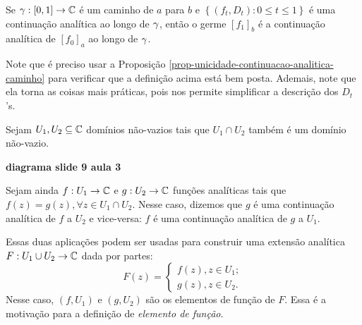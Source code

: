     \begin{definicao}
    \label{def-continuacao-analitica-germe}
        Se $\gamma: [0,1]\to\mathbb{C}$ é um caminho de $a$ para $b$ e 
        $\left\{ (f_t, D_t): 0\leq t\leq 1 \right\}$ é uma continuação analítica ao
        longo de $\gamma$, então o germe $[f_1]_b$ é a continuação analítica de
        $[f_0]_a$ ao longo de $\gamma$.
    \end{definicao}

    Note que é preciso usar a Proposição \ref{prop-unicidade-continuacao-analitica-caminho}
    para verificar que a definição acima está bem posta. Ademais, note que ela torna
    as coisas mais práticas, pois nos permite simplificar a descrição dos $D_t$'s.

    \begin{observacao}
        Sejam $U_1, U_2\subseteq\mathbb{C}$ domínios não-vazios tais que $U_1\cap U_2$
        também é um domínio não-vazio.
        \begin{center}
            \textbf{diagrama slide 9 aula 3}
        \end{center}
        Sejam ainda $f:U_1\to\mathbb{C}$ e $g:U_2\to\mathbb{C}$ funções analíticas
        tais que $f(z) = g(z), \forall z\in U_1\cap U_2$. Nesse caso, dizemos que
        $g$ é uma continuação analítica de $f$ a $U_2$ e vice-versa: $f$ é 
        uma continuação analítica de $g$ a $U_1$.
        
        Essas duas aplicações podem ser usadas para construir uma extensão analítica
        $F: U_1\cup U_2\to\mathbb{C}$ dada por partes:
        \begin{equation*}
            F(z) = 
            \begin{cases}
                f(z), z\in U_1; \\
                g(z), z\in U_2.
            \end{cases}
        \end{equation*}
        Nesse caso, $(f,U_1)$ e $(g,U_2)$ são os elementos de função de $F$. 
        Essa é a motivação para a definição de \textit{elemento de função}.
        

\end{observacao}
